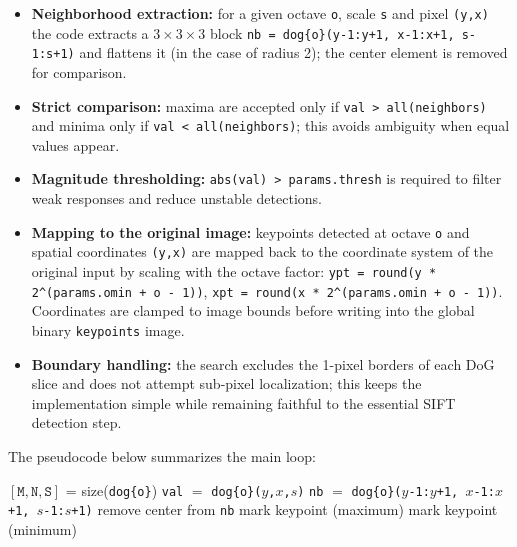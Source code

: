 \documentclass{article}
\begin{document}
\begin{itemize}
    \item \textbf{Neighborhood extraction:} for a given octave \texttt{o}, scale \texttt{s} 
    and pixel \texttt{(y,x)} the code extracts a $3{\times}3{\times}3$ block 
    \texttt{nb = dog\{o\}(y-1:y+1, x-1:x+1, s-1:s+1)} and flattens it (in the case of radius 2); 
    the center element is removed for comparison.
    \item \textbf{Strict comparison:} maxima are accepted only if 
    \texttt{val > all(neighbors)} and minima only if \texttt{val < all(neighbors)}; this 
    avoids ambiguity when equal values appear.
    \item \textbf{Magnitude thresholding:} \texttt{abs(val) > params.thresh} is required to 
    filter weak responses and reduce unstable detections.
    \item \textbf{Mapping to the original image:} keypoints detected at octave \texttt{o} 
    and spatial coordinates \texttt{(y,x)} are mapped back to the coordinate system of the 
    original input by scaling with the octave factor: 
    \texttt{ypt = round(y * 2\^{}(params.omin + o - 1))}, 
    \texttt{xpt = round(x * 2\^{}(params.omin + o - 1))}. Coordinates are clamped to image 
    bounds before writing into the global binary \texttt{keypoints} image.
    \item \textbf{Boundary handling:} the search excludes the 1-pixel borders of each DoG 
    slice and does not attempt sub-pixel localization; this keeps the implementation simple 
    while remaining faithful to the essential SIFT detection step.
\end{itemize}

The pseudocode below summarizes the main loop:

\begin{algorithmic}
    \STATE $[\texttt{M},\texttt{N},\texttt{S}]$ = size(\texttt{dog\{o\}})
                \STATE \texttt{val} $=$ \texttt{dog\{o\}($y$,$x$,$s$)}
                \STATE \texttt{nb} $=$ \texttt{dog\{o\}($y$-1:$y$+1, $x$-1:$x$+1, $s$-1:$s$+1)}
                \STATE remove center from \texttt{nb}
                    \STATE mark keypoint (maximum)
                    \STATE mark keypoint (minimum)
                \ENDIF
            \ENDFOR
        \ENDFOR
    \ENDFOR
\ENDFOR
\end{algorithmic}
\end{document}
